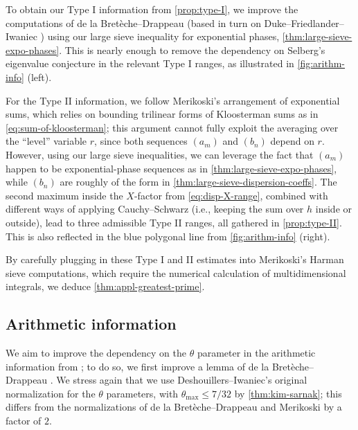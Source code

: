 \documentclass[reqno,11pt]{amsart}
\theoremstyle{remark}
\numberwithin{equation}{section}
\begin{document}
To obtain our Type I information from \cref{prop:type-I}, we improve the computations of de la Bret\`eche--Drappeau \cite[\S 8]{de2020niveau} (based in turn on Duke--Friedlander--Iwaniec \cite{duke1995equidistribution}) using our large sieve inequality for exponential phases, \cref{thm:large-sieve-expo-phases}. This is nearly enough to remove the dependency on Selberg's eigenvalue conjecture in the relevant Type I ranges, as illustrated in \cref{fig:arithm-info} (left).

For the Type II information, we follow Merikoski's arrangement of exponential sums, which relies on bounding trilinear forms of Kloosterman sums as in \cref{eq:sum-of-kloosterman}; this argument cannot fully exploit the averaging over the ``level'' variable $r$, since both sequences $(a_m)$ and $(b_n)$ depend on $r$. However, using our large sieve inequalities, we can leverage the fact that $(a_m)$ happen to be exponential-phase sequences as in \cref{thm:large-sieve-expo-phases}, while $(b_n)$ are roughly of the form in \cref{thm:large-sieve-dispersion-coeffs}. The second maximum inside the $X$-factor from \cref{eq:disp-X-range}, combined with different ways of applying Cauchy--Schwarz (i.e., keeping the sum over $h$ inside or outside), lead to three admissible Type II ranges, all gathered in \cref{prop:type-II}. This is also reflected in the blue polygonal line from \cref{fig:arithm-info} (right). 

By carefully plugging in these
Type I and II estimates into Merikoski’s Harman sieve computations, which require the numerical
calculation of multidimensional integrals, we deduce \cref{thm:appl-greatest-prime}.



\subsection{Arithmetic information} \label{subsec:arithm-info} 
We aim to improve the dependency on the $\theta$ parameter in the arithmetic information from \cite[Propositions 1 and 2]{merikoski2023largest}; to do so, we first improve a lemma of de la Bret\`eche--Drappeau \cite[Lemme 8.3]{de2020niveau}. We stress again that we use Deshouillers--Iwaniec's original normalization for the $\theta$ parameters, with $\theta_{\max} \le 7/32$ by \cref{thm:kim-sarnak}; this differs from the normalizations of de la Bret\`eche--Drappeau \cite{de2020niveau} and Merikoski \cite{merikoski2023largest} by a factor of $2$.
\end{document}
